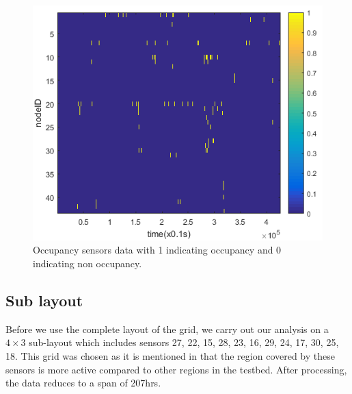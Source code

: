 \begin{figure}[!ht]
\includegraphics{./pics/heatMap.png}
\caption{Occupancy sensors data with 1 indicating occupancy and 0 indicating non occupancy.}
\label{fig:heatMap}
\end{figure}






\subsection{Sub layout}
Before we use the complete layout of the grid, we carry out our analysis on a $4 \times 3$ sub-layout which includes sensors 27, 22, 15, 28, 23, 16, 29, 24, 17, 30, 25, 18. This grid was chosen as it is mentioned in \cite{cook2010detection} that the region covered by these sensors is more active compared to other regions in the testbed. After processing, the data reduces to a span of 207hrs. 


